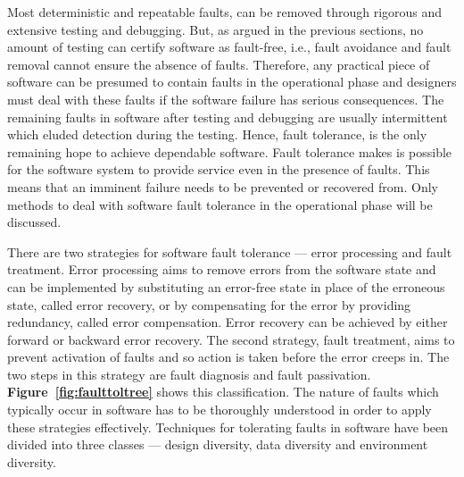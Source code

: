 \documentclass[a4paper, 11pt]{article}
\newcommand{\cmark}{\ding{51}}%
\begin{document}
Most deterministic and repeatable faults, can be removed through rigorous and extensive testing and debugging. But, as argued in the previous sections, no amount of testing can certify software as fault-free, i.e., fault avoidance and fault removal cannot ensure the absence of faults. Therefore, any practical piece of software can be presumed to contain faults in the operational phase and designers must deal with these faults if the software failure has serious consequences. The remaining faults in software after testing and debugging are usually intermittent which eluded detection during the testing. Hence, fault tolerance, is the only remaining hope to achieve dependable software. Fault tolerance makes is possible for the software system to provide service even in the presence of faults. This means that an imminent failure needs to be prevented or recovered from. Only methods to deal with software fault tolerance in the operational phase will be discussed.

There are two strategies for software fault tolerance --- error processing and fault treatment. Error processing aims to remove errors from the software state and can be implemented by substituting an error-free state in place of the erroneous state, called error recovery, or by compensating for the error by providing redundancy, called error compensation. Error recovery can be achieved by either forward or backward error recovery. The second strategy, fault treatment, aims to prevent activation of faults and so action is taken before the error creeps in. The two steps in this strategy are fault diagnosis and fault passivation. \textbf{Figure~\ref{fig:faulttoltree}} shows this classification. The nature of faults which typically occur in software has to be thoroughly understood in order to apply these strategies effectively. Techniques for tolerating faults in software have been divided into three classes --- design diversity, data diversity and environment diversity.

%
\end{document}
